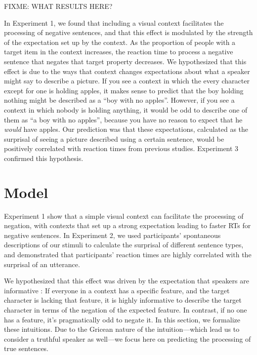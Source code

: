 \documentclass[man]{apa2}
\begin{document}
FIXME: WHAT RESULTS HERE?


In Experiment 1, we found that including a visual context facilitates the processing of negative sentences, and that this effect is modulated by the strength of the expectation set up by the context.  As the proportion of people with a target item in the context increases, the reaction time to process a negative sentence that negates that target property decreases.  We hypothesized that this effect is due to the ways that context changes expectations about what a speaker might say to describe a picture.  If you see a context in which the every character except for one is holding apples, it makes sense to predict that the boy holding nothing might be described as a ``boy with no apples''.  However, if you see a context in which nobody is holding anything, it would be odd to describe one of them as ``a boy with no apples'', because you have no reason to expect that he \emph{would} have apples.  Our prediction was that these expectations, calculated as the surprisal of seeing a picture described using a certain sentence, would be positively correlated with reaction times from previous studies.  Experiment 3 confirmed this hypothesis.  

\section{Model}

Experiment 1 show that a simple visual context can facilitate the processing of negation, with contexts that set up a strong expectation leading to faster RTs for negative sentences.  In Experiment 2, we used participants' spontaneous descriptions of our stimuli to calculate the surprisal of different sentence types, and demonstrated that participants' reaction times are highly correlated with the surprisal of an utterance. 

We hypothesized that this effect was driven by the expectation that speakers are informative \cite{grice1975,frank2012}: If everyone in a context has a specific feature, and the target character is lacking that feature, it is highly informative to describe the target character in terms of the negation of the expected feature. In contrast, if no one has a feature, it's pragmatically odd to negate it. In this section, we formalize these intuitions. Due to the Gricean nature of the intuition---which lead us to consider a truthful speaker as well---we focus here on predicting the processing of true sentences.   
\end{document}
